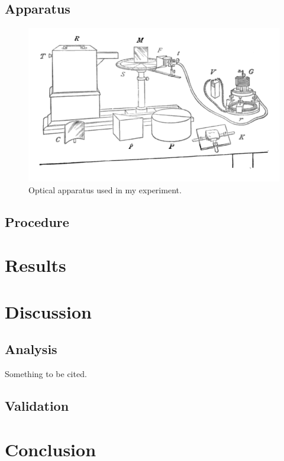 \documentclass{Resources/netsci-project}
\begin{document}
\subsection{Apparatus}
\lipsum[5]
\begin{figure}
    \centering
    \includegraphics[width=\linewidth]{Resources/apparatus}
    \caption{Optical apparatus used in my experiment.\cite{reference1}}
    \label{fig:my_label}
\end{figure}

\subsection{Procedure}
\lipsum[6]

\section{Results}
\lipsum[7]

\section{Discussion}
\subsection{Analysis}
\lipsum[8]
Something to be cited.\cite{reference2}
\lipsum[2]

\subsection{Validation}
\lipsum[9]

\section{Conclusion}
\lipsum[10]


\printbibliography
\end{document}
